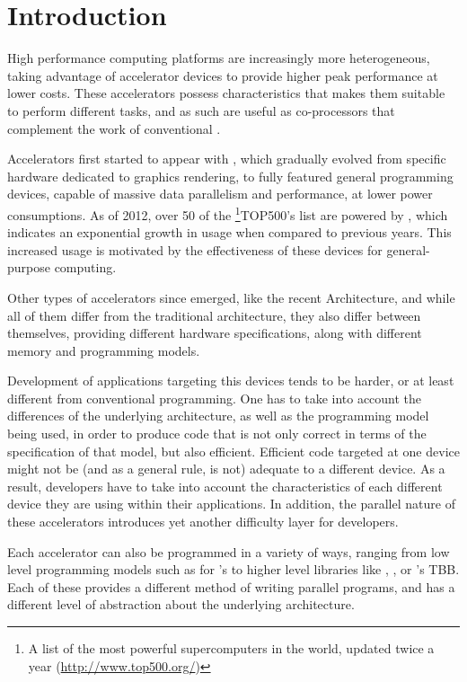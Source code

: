 \documentclass[main.tex]{subfiles}
\begin{document}
\chapter{Introduction}

High performance computing platforms are increasingly more heterogeneous, taking advantage of accelerator devices to provide higher peak performance at lower costs. These accelerators possess characteristics that makes them suitable to perform different tasks, and as such are useful as co-processors that complement the work of conventional \cpus.

Accelerators first started to appear with \gpus, which gradually evolved from specific hardware dedicated to graphics rendering, to fully featured general programming devices, capable of massive data parallelism and performance, at lower power consumptions. As of 2012, over 50 of the \footnote{A list of the most powerful supercomputers in the world, updated twice a year (\url{http://www.top500.org/})}{TOP500's} list are powered by \gpus, which indicates an exponential growth in usage when compared to previous years. This increased usage is motivated by the effectiveness of these devices for general-purpose computing. 

Other types of accelerators since emerged, like the recent \intel \mic Architecture, and while all of them differ from the traditional \cpu architecture, they also differ between themselves, providing different hardware specifications, along with different memory and programming models. 

Development of applications targeting this devices tends to be harder, or at least different from conventional programming. One has to take into account the differences of the underlying architecture, as well as the programming model being used, in order to produce code that is not only correct in terms of the specification of that model, but also efficient. Efficient code targeted at one device might not be (and as a general rule, is not) adequate to a different device. As a result, developers have to take into account the characteristics of each different device they are using within their applications. In addition, the parallel nature of these accelerators introduces yet another difficulty layer for developers.

Each accelerator can also be programmed in a variety of ways, ranging from low level programming models such as \cuda for \nvidia's \gpus to higher level libraries like \openmp, \openacc, or \intel's \acs{TBB}. Each of these provides a different method of writing parallel programs, and has a different level of abstraction about the underlying architecture. 
\end{document}
